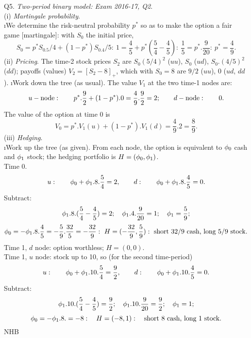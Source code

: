 \documentclass[12pt]{article}
\begin{document}
\ni Q5. {\it Two-period binary model: Exam 2016-17, Q2}. \\
\ni (i) {\it Martingale probability}. \\
\i We determine the risk-neutral probability $p^{\ast}$ so as to make the option a fair game [martingale]: with $S_0$ the initial price,
$$
S_0 = p^{\ast}S_0.5/4 + (1 - p^{\ast}) S_0.4/5: \
1 = \frac{4}{5} + p^{\ast} (\frac{5}{4} - \frac{4}{5}): \
\frac{1}{5} = p^{\ast}.\frac{9}{20}: \
p^{\ast} = \frac{4}{9}.                                                  
$$
\ni (ii) {\it Pricing}.  The time-2 stock prices $S_2$ are $S_0 (5/4)^2$ ($uu$), $S_0$ ($ud$), $S_0.(4/5)^2$ ($dd$); payoffs (values) $V_2 = [S_2 - 8]_+$, which with $S_0 = 8$ are $9/2$ ($uu$), 0 ($ud$, $dd$). 
\i Work down the tree (as usual).  The value $V_1$ at the two time-1 nodes are: \\
$$
u-\hbox{node}: \qquad  p^{\ast}.\frac{9}{2} + (1 - p^{\ast}).0 = \frac{4}{9}.\frac{9}{2} = 2; 
\qquad d-\hbox{node}: \qquad 0.                                         
$$ 
The value of the option at time 0 is
$$
V_0 = p^{\ast}.V_1(u) + (1 - p^{\ast}).V_1(d) = \frac{4}{9}.2 = \frac{8}{9}. 
$$
\ni (iii) {\it Hedging}. \\
\i Work up the tree (as given).  From each node, the option is equivalent to ${\phi}_0$ cash and ${\phi}_1$ stock; the hedging portfolio is $H = ({\phi}_0, {\phi}_1)$. \\
Time 0. 
$$
u: \qquad {\phi}_0 + {\phi}_1.8.\frac{5}{4} = 2, \qquad
d: \qquad {\phi}_0 + {\phi}_1.8.\frac{4}{5} = 0.
$$
Subtract: 
$$
{\phi}_1.8.(\frac{5}{4} - \frac{4}{5}) = 2; \quad {\phi}_1.4.\frac{9}{20} = 1; \quad {\phi}_1 = \frac{5}{9};
$$
$$
{\p}_0 
= - {\p}_1.8.\frac{4}{5} 
= - \frac{5}{9}.\frac{32}{5} 
= - \frac{32}{9}: \ H = (- \frac{32}{9}, \frac{5}{9}): \ 
\hbox{short 32/9 cash, long 5/9 stock}.                                 
$$
Time 1, $d$ node: option worthless; $H = (0,0)$.  \\
Time 1, $u$ node: stock up to 10, so (for the second time-period)
$$
u: \qquad {\phi}_0 + {\phi}_1.10.\frac{5}{4} = \frac{9}{2}, \qquad
d: \qquad {\phi}_0 + {\phi}_1.10.\frac{4}{5} = 0.
$$
Subtract: 
$$
{\phi}_1.10.(\frac{5}{4} - \frac{4}{5}) = \frac{9}{2}; \quad {\phi}_1.10.\frac{9}{20} = \frac{9}{2}; \quad 
{\phi}_1 = 1;
$$
$$
{\phi}_0 = - {\phi}_1.8. = -8: \quad 
H = (- 8, 1): \quad \hbox{short 8 cash, long 1 stock}.                  
$$
\hfil NHB \break
\end{document}
